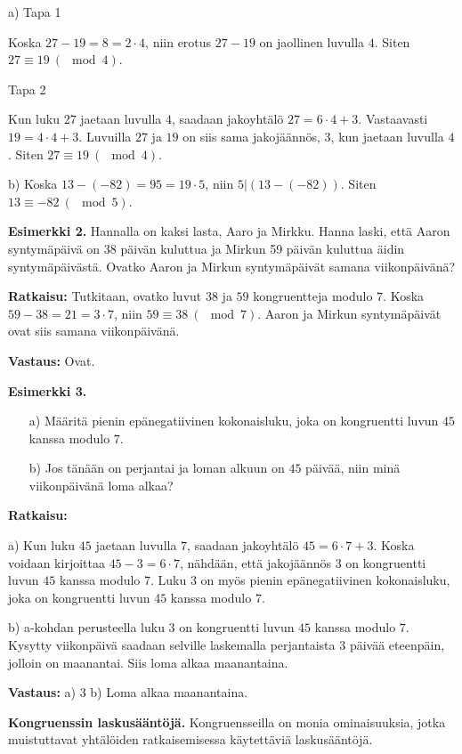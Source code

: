 a) Tapa 1

Koska $27 - 19 = 8 = 2\cdot 4$, niin erotus $27-19$ on jaollinen luvulla $4$. Siten $27 \equiv 19 \ (\mod 4)$.

Tapa 2

Kun luku $27$ jaetaan luvulla $4$, saadaan jakoyhtälö $27 = 6 \cdot 4 + 3$. Vastaavasti $19 = 4 \cdot 4 + 3$. Luvuilla $27$ ja $19$ on siis sama jakojäännös, $3$, kun jaetaan luvulla $4$. Siten $27 \equiv 19\ (\mod 4)$.

b) Koska $13 - (-82) = 95 = 19 \cdot 5$, niin $5 | (13 - (-82))$. Siten $13 \equiv -82 \ (\mod 5)$.


{\bf Esimerkki 2.}
Hannalla on kaksi lasta, Aaro ja Mirkku. Hanna laski, että Aaron syntymäpäivä on 38 päivän kuluttua  ja Mirkun 59 päivän kuluttua äidin syntymäpäivästä. Ovatko Aaron ja Mirkun syntymäpäivät samana viikonpäivänä?

{\bf Ratkaisu:}
Tutkitaan, ovatko luvut $38$ ja $59$ kongruentteja modulo $7$. Koska $59 - 38 = 21 = 3\cdot 7$, niin $59 \equiv 38\ (\mod 7)$. Aaron ja Mirkun syntymäpäivät ovat siis  samana viikonpäivänä.

{\bf Vastaus:} Ovat.


{\bf Esimerkki 3.} 
\begin{itemize}
\item[a)] Määritä pienin epänegatiivinen kokonaisluku, joka on kongruentti luvun $45$ kanssa modulo $7$.
\item[b)] Jos tänään on perjantai ja loman alkuun on $45$ päivää, niin minä viikonpäivänä loma alkaa?
\end{itemize}

{\bf Ratkaisu:}

a)
Kun luku $45$ jaetaan luvulla $7$, saadaan jakoyhtälö $45 = 6 \cdot 7 + 3$. Koska voidaan kirjoittaa $45 - 3 = 6 \cdot 7$, nähdään, että jakojäännös $3$ on kongruentti luvun $45$ kanssa modulo 7. Luku $3$ on myös pienin epänegatiivinen kokonaisluku, joka on kongruentti luvun $45$ kanssa modulo $7$.

b)
a-kohdan perusteella luku $3$ on kongruentti luvun $45$ kanssa modulo $7$. Kysytty viikonpäivä saadaan selville laskemalla perjantaista $3$ päivää eteenpäin, jolloin on maanantai. Siis loma alkaa maanantaina. 

{\bf Vastaus:} a) 3 b) Loma alkaa maanantaina.


{\bf Kongruenssin laskusääntöjä.} Kongruensseilla on monia ominaisuuksia, jotka muistuttavat yhtälöiden ratkaisemisessa käytettäviä laskusääntöjä.

